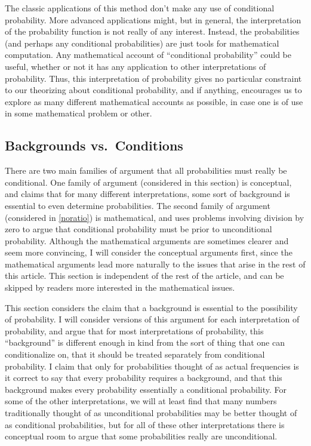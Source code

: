 The classic applications of this method don't make any use of conditional probability. More advanced applications might, but in general, the interpretation of the probability function is not really of any interest. Instead, the probabilities (and perhaps any conditional probabilities) are just tools for mathematical computation. Any mathematical account of ``conditional probability'' could be useful, whether or not it has any application to other interpretations of probability. Thus, this interpretation of probability gives no particular constraint to our theorizing about conditional probability, and if anything, encourages us to explore as many different mathematical accounts as possible, in case one is of use in some mathematical problem or other.

\subsection{Backgrounds vs.\ Conditions}\label{background}

There are two main families of argument that all probabilities must really be conditional. One family of argument (considered in this section) is conceptual, and claims that for many different interpretations, some sort of background is essential to even determine probabilities. The second family of argument (considered in \autoref{noratio}) is mathematical, and uses problems involving division by zero to argue that conditional probability must be prior to unconditional probability. Although the mathematical arguments are sometimes clearer and seem more convincing, I will consider the conceptual arguments first, since the mathematical arguments lead more naturally to the issues that arise in the rest of this article. This section is independent of the rest of the article, and can be skipped by readers more interested in the mathematical issues.

This section considers the claim that a background is essential to the possibility of probability. I will consider versions of this argument for each interpretation of probability, and argue that for most interpretations of probability, this ``background'' is different enough in kind from the sort of thing that one can conditionalize on, that it should be treated separately from conditional probability. I claim that only for probabilities thought of as actual frequencies is it correct to say that every probability requires a background, and that this background makes every probability essentially a conditional probability. For some of the other interpretations, we will at least find that many numbers traditionally thought of as unconditional probabilities may be better thought of as conditional probabilities, but for all of these other interpretations there is conceptual room to argue that some probabilities really are unconditional.

